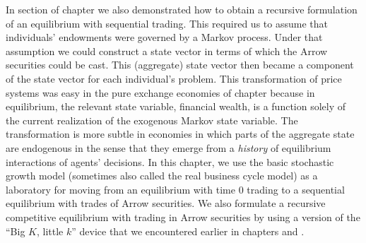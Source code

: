In section  of  chapter  we also demonstrated how to obtain a
recursive formulation of an equilibrium with sequential trading.
This required us to assume that individuals' endowments
were governed by a Markov process. Under that assumption
we could construct a state vector
in terms of which the Arrow securities could be cast.  This
(aggregate)
state vector  then became a component of the state
vector for each individual's problem.
This transformation of price systems was easy in
    the pure exchange economies of chapter 
because in equilibrium,  the relevant state variable, financial wealth, is a
function solely of the
current realization of the exogenous Markov state variable.
The transformation is more subtle in economies in which
parts of the aggregate state are endogenous in the sense that they
emerge from a
{\it history}
of
equilibrium interactions of agents' decisions. In
this chapter, we use the basic stochastic growth model (sometimes
also called the real business cycle model) as a laboratory for
moving from an equilibrium with time $0$ trading to a sequential
equilibrium with trades of Arrow securities. %
We also formulate  a
recursive competitive equilibrium with trading in Arrow securities
by using a version of
  the ``Big $K$, little $k$'' device that we encountered earlier in chapters  and .








